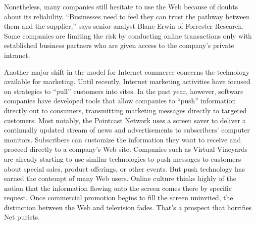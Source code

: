 Nonetheless, many companies still hesitate to use the Web because of doubts about its reliability. “Businesses need to feel they can trust the pathway between them and the supplier,” says senior analyst Blane Erwin of Forrester Research. Some companies are limiting the risk by conducting online transactions only with established business partners who are given access to the company’s private intranet.

Another major shift in the model for Internet commerce concerns the technology available for marketing. Until recently, Internet marketing activities have focused on strategies to “pull” customers into sites. In the past year, however, software companies have developed tools that allow companies to “push” information directly out to consumers, transmitting marketing messages directly to targeted customers. Most notably, the Pointcast Network uses a screen saver to deliver a continually updated stream of news and advertisements to subscribers’ computer monitors. Subscribers can customize the information they want to receive and proceed directly to a company’s Web site. Companies such as Virtual Vineyards are already starting to use similar technologies to push messages to customers about special sales, product offerings, or other events. But push technology has earned the contempt of many Web users. Online culture thinks highly of the notion that the information flowing onto the screen comes there by specific request. Once commercial promotion begins to fill the screen uninvited, the distinction between the Web and television fades. That’s a prospect that horrifies Net purists.

